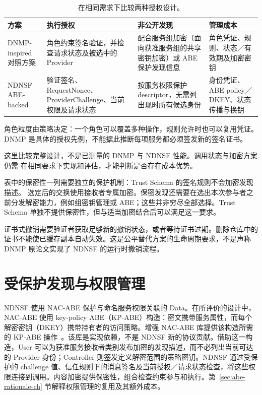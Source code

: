 \begin{table}[htbp]\centering\small
\caption{在相同需求下比较两种授权设计。}
\begin{tabularx}{\textwidth}{p{}XXX}
\toprule 方案 & 执行授权 & 非公开发现 & 管理成本\\\midrule
DNMP-inspired 对照方案 & 角色约束签名验证，并检查请求状态及被选中的 Provider & 配合服务组加密（面向获准服务组的共享密钥加密）或 ABE 保护发现信息 & 角色凭证、规则、状态／有效期及加密密钥\\\midrule
NDNSF ABE-backed & 验证签名、RequestNonce、ProviderChallenge、当前权限及请求状态 & 按服务权限保护 descriptor，无需列出现时所有候选身份 & 身份凭证、ABE policy／DKEY、状态传播与换钥\\\bottomrule
\end{tabularx}\end{table}

角色粒度由策略决定：一个角色可以覆盖多种操作，规则允许时也可以复用凭证。
DNMP 是具体的授权先例，不能据此推断每项服务都必须签发新的签名证书。

这里比较完整设计，不是已测量的 DNMP 与 NDNSF 性能。调用状态与加密方案仍需
在相同要求下实现和评估，才能判断是否存在成本优势。

表中的保密性一列需要独立的保护机制：Trust Schema 的签名规则不会加密发现描述。
选定后的交换使用接收者专属加密。保密发现还需要在选出本次参与者之前分发解密能力，例如组密钥管理或 ABE；这些并非穷尽全部选择。Trust Schema 单独不提供保密性，但与适当加密结合后可以满足这一要求。

证书式撤销需要验证者获取足够新的撤销状态，或者等待证书过期。删除仓库中的证书不能使已缓存副本自动失效。这是公平替代方案的生命周期要求，不是声称 DNMP 原论文实现了 NDNSF 的运行时撤销流程。

\section{受保护发现与权限管理}
NDNSF 使用 NAC-ABE 保护与命名服务权限关联的 Data。在所评价的设计中，NAC-ABE 使用 key-policy ABE（KP-ABE）构造：密文携带服务属性，而每个解密密钥（DKEY）携带持有者的访问策略。增强 NAC-ABE 库提供该构造所需的 KP-ABE 操作~\cite{dulal2023nacabe}。该库是实现依赖，不是 NDNSF 新的协议贡献。借助这一构造，User 可以为获准服务接收者类别发布加密的发现描述，而不必列出当前可达的 Provider 身份；Controller 则签发定义解密范围的策略密钥。NDNSF 通过受保护的 challenge 值、信任规则下的消息签名及当前授权／请求状态检查，将这些权限连接到调用。内容加密提供保密性，组合检查约束参与和执行。第~\ref{sec:abe-rationale-ch} 节解释权限管理的复用及其额外成本。

